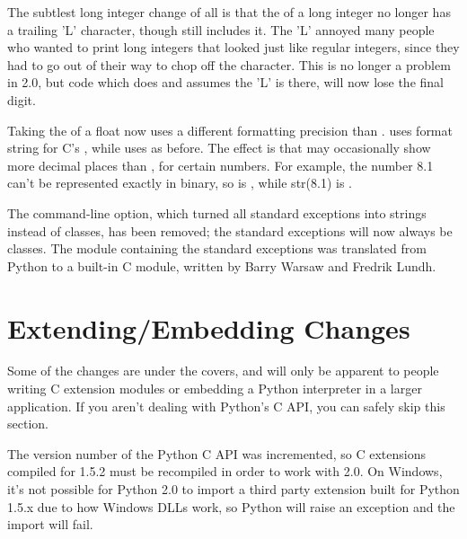 \documentclass{howto}
\begin{document}
The subtlest long integer change of all is that the 
of a long integer no longer has a trailing 'L' character, though
 still includes it.  The 'L' annoyed many people who
wanted to print long integers that looked just like regular integers,
since they had to go out of their way to chop off the character.  This
is no longer a problem in 2.0, but code which does  and assumes the 'L' is there, will now lose
the final digit.

Taking the  of a float now uses a different
formatting precision than .   uses
 format string for C's , while
 uses  as before.  The effect is that 
 may occasionally show more decimal places than 
, for certain numbers. 
For example, the number 8.1 can't be represented exactly in binary, so
 is , while str(8.1) is
.

The  command-line option, which turned all standard
exceptions into strings instead of classes, has been removed; the
standard exceptions will now always be classes.  The
 module containing the standard exceptions was
translated from Python to a built-in C module, written by Barry Warsaw
and Fredrik Lundh.


\section{Extending/Embedding Changes}

Some of the changes are under the covers, and will only be apparent to
people writing C extension modules or embedding a Python interpreter
in a larger application.  If you aren't dealing with Python's C API,
you can safely skip this section.

The version number of the Python C API was incremented, so C
extensions compiled for 1.5.2 must be recompiled in order to work with
2.0.  On Windows, it's not possible for Python 2.0 to import a third
party extension built for Python 1.5.x due to how Windows DLLs work,
so Python will raise an exception and the import will fail.
\end{document}
